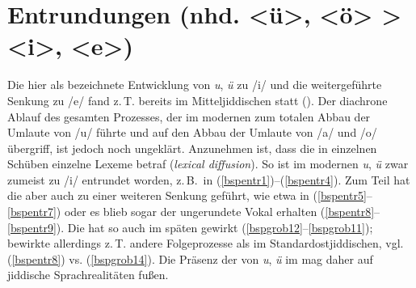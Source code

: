     \section{Entrundungen (nhd. <ü>, <ö> > <i>, <e>)}\label{entrundung}
Die hier als  bezeichnete Entwicklung von {\mhd} \textit{u}, \textit{ü} zu /i/ und die weitergeführte Senkung zu /e/ fand z.\,T. bereits im Mitteljiddischen statt (\citealt[173f, 209–213]{Timm1987}). Der diachrone Ablauf des gesamten Prozesses, der im modernen \hai{{\OJ}} zum totalen Abbau der Umlaute von /u/ führte und auf den Abbau der Umlaute von /a/ und /o/ übergriff, ist jedoch noch ungeklärt. Anzunehmen ist, dass die  in einzelnen Schüben einzelne Lexeme betraf (\textit{lexical diffusion}). So ist im modernen \hai{{\OJ}} {\mhd} \textit{u}, \textit{ü} zwar zumeist zu /i/ entrundet worden, z.\,B.\, in (\ref{bspentr1})–(\ref{bspentr4}). Zum Teil hat die  aber auch zu einer weiteren Senkung geführt, wie etwa in (\ref{bspentr5}–\ref{bspentr7}) oder es blieb sogar der {\mhd} ungerundete Vokal erhalten  (\ref{bspentr8}–\ref{bspentr9}). Die  hat so auch im späten \hai{{\WJ}} gewirkt (\ref{bspgrob12}–\ref{bspgrob11});\, bewirkte allerdings z.\,T. andere Folgeprozesse als im Standardostjiddischen, vgl.\, (\ref{bspentr8}) vs. (\ref{bspgrob14}). Die Präsenz der  von {\mhd} \textit{u}, \textit{ü} im \hai{{\LiJi}} mag daher auf jiddische Sprachrealitäten fußen.
 
 
 
